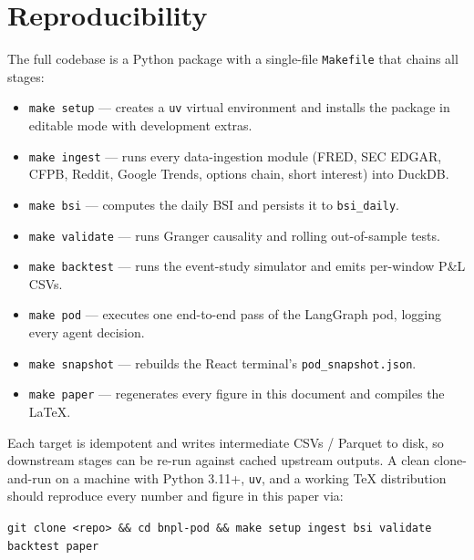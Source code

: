 \documentclass[11pt,letterpaper]{article}
\begin{document}



\appendix
\section{Reproducibility}
\label{app:repro}

The full codebase is a Python package with a single-file
\texttt{Makefile} that chains all stages:

\begin{itemize}[leftmargin=2em,noitemsep]
\item \texttt{make setup} --- creates a \texttt{uv} virtual
environment and installs the package in editable mode with
development extras.
\item \texttt{make ingest} --- runs every data-ingestion module
(FRED, SEC EDGAR, CFPB, Reddit, Google Trends, options chain,
short interest) into DuckDB.
\item \texttt{make bsi} --- computes the daily BSI and persists
it to \texttt{bsi\_daily}.
\item \texttt{make validate} --- runs Granger causality and
rolling out-of-sample tests.
\item \texttt{make backtest} --- runs the event-study simulator
and emits per-window P\&L CSVs.
\item \texttt{make pod} --- executes one end-to-end pass of the
LangGraph pod, logging every agent decision.
\item \texttt{make snapshot} --- rebuilds the React terminal's
\texttt{pod\_snapshot.json}.
\item \texttt{make paper} --- regenerates every figure in this
document and compiles the LaTeX.
\end{itemize}

Each target is idempotent and writes intermediate CSVs / Parquet
to disk, so downstream stages can be re-run against cached
upstream outputs. A clean clone-and-run on a machine with Python
3.11+, \texttt{uv}, and a working \TeX{} distribution should
reproduce every number and figure in this paper via:
\begin{center}
\texttt{git clone <repo> \&\& cd bnpl-pod \&\& make setup ingest bsi validate backtest paper}
\end{center}


\end{document}
